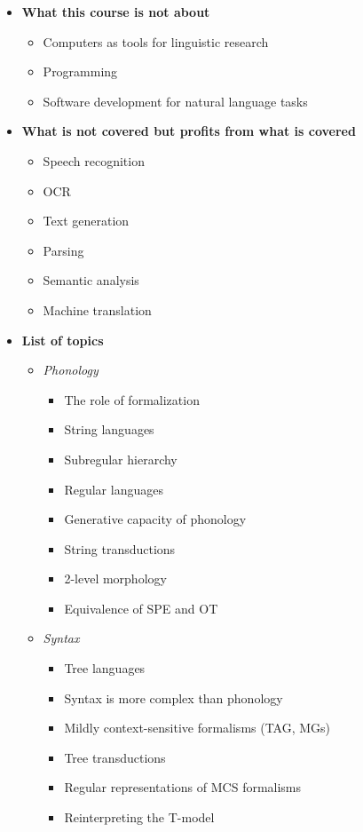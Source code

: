 \begin{itemize}
    \item \textbf{What this course is not about}
        \begin{itemize}
            \item Computers as tools for linguistic research
            \item Programming
            \item Software development for natural language tasks
        \end{itemize}
    \item \textbf{What is not covered but profits from what is covered}
        \begin{itemize}
            \item Speech recognition
            \item OCR
            \item Text generation
            \item Parsing
            \item Semantic analysis
            \item Machine translation
        \end{itemize}
    \item \textbf{List of topics}
        \begin{itemize}
            \item \emph{Phonology}
                \begin{itemize}
                    \item The role of formalization
                    \item String languages
                    \item Subregular hierarchy
                    \item Regular languages
                    \item Generative capacity of phonology
                    \item String transductions
                    \item 2-level morphology
                    \item Equivalence of SPE and OT
                \end{itemize}
            \item \emph{Syntax}
                \begin{itemize}
                    \item Tree languages
                    \item Syntax is more complex than phonology
                    \item Mildly context-sensitive formalisms (TAG, MGs)
                    \item Tree transductions
                    \item Regular representations of MCS formalisms
                    \item Reinterpreting the T-model
                \end{itemize}
        \end{itemize}
\end{itemize}

